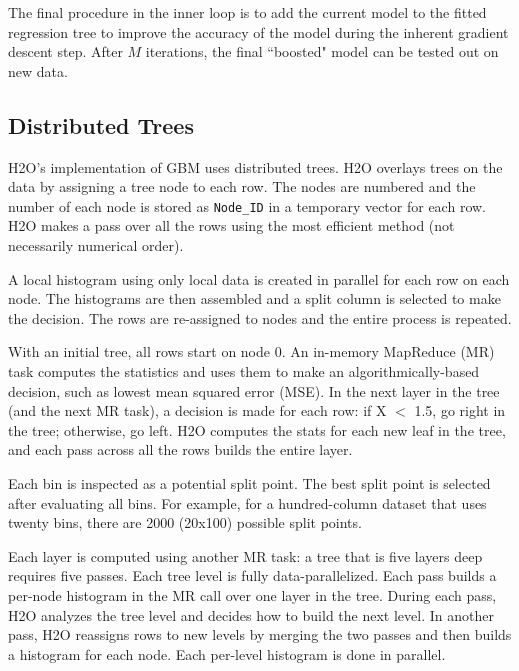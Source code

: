 The final procedure in the inner loop is to add the current model to the fitted regression tree to improve the accuracy of the model during the inherent gradient descent step. After $M$ iterations, the final ``boosted" model can be tested out on new data.


\subsection{Distributed Trees}

H2O's implementation of GBM uses distributed trees. H2O overlays trees on the data by assigning a tree node to each row.
The nodes are numbered and the number of each node is stored as {\texttt{Node\_ID}} in a temporary vector for each row. H2O makes a pass over all the rows using the most efficient method (not necessarily numerical order). 

A local
histogram using only local data is created in parallel for each row on each node. The histograms are then assembled and a split column is selected to make the decision. The rows are re-assigned to nodes and the entire process is repeated.

With an initial tree, all rows start on node 0. An in-memory MapReduce (MR) task computes the statistics and uses
them to make an algorithmically-based decision, such as lowest mean squared error (MSE). In the next layer in the
tree (and the next MR task), a decision is made for each row: if X $<$ 1.5, go right in the tree; otherwise, go left.
H2O computes the stats for each new leaf in the tree, and each pass across all the rows builds the entire layer.

Each bin is inspected as a potential split point. The best split point is selected after evaluating all bins. For example, for a hundred-column dataset that uses twenty bins, there are 2000 (20x100) possible split points.

Each layer is computed using another MR task: a tree that is five layers deep requires five passes. Each tree
level is fully data-parallelized. Each pass  builds a per-node histogram in the MR call over one layer in the tree.  During each pass, H2O analyzes the tree level and decides how to build the next level. In another pass, H2O reassigns rows to new levels by merging the two passes and then builds a histogram for each node. Each per-level histogram is done in parallel.

